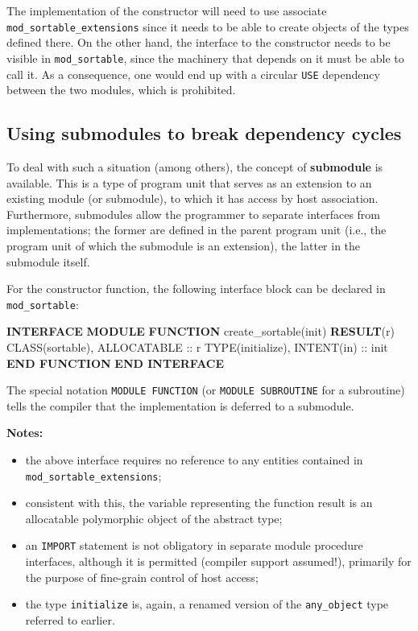 \documentclass[
]{scrartcl}
\newenvironment{Shaded}{}{}
\newcommand{\DataTypeTok}[1]{\textcolor[rgb]{0.56,0.13,0.00}{#1}}
\newcommand{\KeywordTok}[1]{\textcolor[rgb]{0.00,0.44,0.13}{\textbf{#1}}}
\newcommand{\NormalTok}[1]{#1}
\providecommand{\tightlist}{%
  \setlength{\itemsep}{0pt}\setlength{\parskip}{0pt}}
\begin{document}
The implementation of the constructor will need to use associate
\texttt{mod\_sortable\_extensions} since it needs to be able to create
objects of the types defined there. On the other hand, the interface to
the constructor needs to be visible in \texttt{mod\_sortable}, since the
machinery that depends on it must be able to call it. As a consequence,
one would end up with a circular \texttt{USE} dependency between the two
modules, which is prohibited.

\subsection{Using submodules to break dependency
cycles}\label{using-submodules-to-break-dependency-cycles}

To deal with such a situation (among others), the concept of
\textbf{submodule} is available. This is a type of program unit that
serves as an extension to an existing module (or submodule), to which it
has access by host association. Furthermore, submodules allow the
programmer to separate interfaces from implementations; the former are
defined in the parent program unit (i.e., the program unit of which the
submodule is an extension), the latter in the submodule itself.

For the constructor function, the following interface block can be
declared in \texttt{mod\_sortable}:

\begin{Shaded}
\begin{Highlighting}[]
\KeywordTok{INTERFACE}
   \KeywordTok{MODULE} \KeywordTok{FUNCTION}\NormalTok{ create\_sortable(init) }\KeywordTok{RESULT}\NormalTok{(r)}
      \DataTypeTok{CLASS(sortable)}\NormalTok{, }\DataTypeTok{ALLOCATABLE} \DataTypeTok{::}\NormalTok{ r}
      \DataTypeTok{TYPE(initialize)}\NormalTok{, }\DataTypeTok{INTENT(in)} \DataTypeTok{::}\NormalTok{ init}
   \KeywordTok{END FUNCTION}
\KeywordTok{END INTERFACE}
\end{Highlighting}
\end{Shaded}

The special notation \texttt{MODULE\ FUNCTION} (or
\texttt{MODULE\ SUBROUTINE} for a subroutine) tells the compiler that
the implementation is deferred to a submodule.

\textbf{Notes:}

\begin{itemize}
\tightlist
\item
  the above interface requires no reference to any entities contained in
  \texttt{mod\_sortable\_extensions};
\item
  consistent with this, the variable representing the function result is
  an allocatable polymorphic object of the abstract type;
\item
  an \texttt{IMPORT} statement is not obligatory in separate module
  procedure interfaces, although it is permitted (compiler support
  assumed!), primarily for the purpose of fine-grain control of host
  access;
\item
  the type \texttt{initialize} is, again, a renamed version of the
  \texttt{any\_object} type referred to earlier.
\end{itemize}
\end{document}
